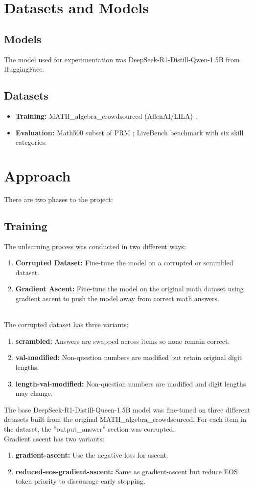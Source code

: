 \documentclass[10.5pt]{article}
\begin{document}
\section{Datasets and Models}
\subsection{Models}
The model used for experimentation was DeepSeek-R1-Distill-Qwen-1.5B from HuggingFace.
\subsection{Datasets}
\begin{itemize}
  \item \textbf{Training:} MATH\_algebra\_crowdsourced (AllenAI/LILA) \cite{mishra2022lila}.
  \item \textbf{Evaluation:} Math500 subset of PRM \cite{lightman2023lets}; LiveBench benchmark with six skill categories.
\end{itemize}


\section{Approach}
There are two phases to the project:

\subsection{Training}
The unlearning process was conducted in two different ways:
\begin{enumerate}
    \item \textbf{Corrupted Dataset:} Fine-tune the model on a corrupted or scrambled dataset.
    \item \textbf{Gradient Ascent:} Fine-tune the model on the original math dataset using gradient ascent to push the model away from correct math answers.
\end{enumerate}
\\
The corrupted dataset has three variants:
\begin{enumerate}
    \item \textbf{scrambled:} Answers are swapped across items so none remain correct.
    \item \textbf{val-modified:} Non-question numbers are modified but retain original digit lengths.
    \item \textbf{length-val-modified:} Non-question numbers are modified and digit lengths may change.
\end{enumerate}
The base DeepSeek-R1-Distill-Queen-1.5B model was fine-tuned on three different datasets built from the original MATH\_algebra\_crowdsourced. For each item in the dataset, the ''output\_answer'' section was corrupted.
\\
Gradient ascent has two variants:
\begin{enumerate}
    \item \textbf{gradient-ascent:} Use the negative loss for ascent.
    \item \textbf{reduced-eos-gradient-ascent:} Same as gradient-ascent but reduce EOS token priority to discourage early stopping.
\end{enumerate}
\end{document}

